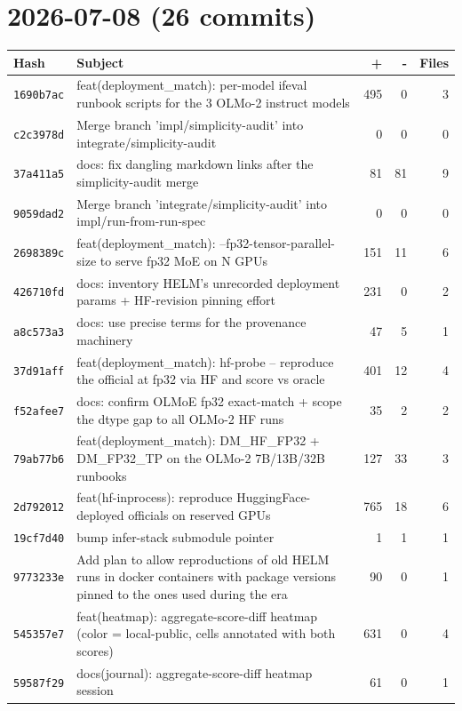 \section*{2026-07-08 (26 commits)}
\begin{longtable}{@{}p{}p{}r r r@{}}
\toprule Hash & Subject & + & - & Files \\ \midrule\endhead
\texttt{1690b7ac} & feat(deployment\_match): per-model ifeval runbook scripts for the 3 OLMo-2 instruct models & 495 & 0 & 3 \\
\texttt{c2c3978d} & Merge branch 'impl/simplicity-audit' into integrate/simplicity-audit & 0 & 0 & 0 \\
\texttt{37a411a5} & docs: fix dangling markdown links after the simplicity-audit merge & 81 & 81 & 9 \\
\texttt{9059dad2} & Merge branch 'integrate/simplicity-audit' into impl/run-from-run-spec & 0 & 0 & 0 \\
\texttt{2698389c} & feat(deployment\_match): --fp32-tensor-parallel-size to serve fp32 MoE on N GPUs & 151 & 11 & 6 \\
\texttt{426710fd} & docs: inventory HELM's unrecorded deployment params + HF-revision pinning effort & 231 & 0 & 2 \\
\texttt{a8c573a3} & docs: use precise terms for the provenance machinery & 47 & 5 & 1 \\
\texttt{37d91aff} & feat(deployment\_match): hf-probe -- reproduce the official at fp32 via HF and score vs oracle & 401 & 12 & 4 \\
\texttt{f52afee7} & docs: confirm OLMoE fp32 exact-match + scope the dtype gap to all OLMo-2 HF runs & 35 & 2 & 2 \\
\texttt{79ab77b6} & feat(deployment\_match): DM\_HF\_FP32 + DM\_FP32\_TP on the OLMo-2 7B/13B/32B runbooks & 127 & 33 & 3 \\
\texttt{2d792012} & feat(hf-inprocess): reproduce HuggingFace-deployed officials on reserved GPUs & 765 & 18 & 6 \\
\texttt{19cf7d40} & bump infer-stack submodule pointer & 1 & 1 & 1 \\
\texttt{9773233e} & Add plan to allow reproductions of old HELM runs in docker containers with package versions pinned to the ones used during the era & 90 & 0 & 1 \\
\texttt{545357e7} & feat(heatmap): aggregate-score-diff heatmap (color = local-public, cells annotated with both scores) & 631 & 0 & 4 \\
\texttt{59587f29} & docs(journal): aggregate-score-diff heatmap session & 61 & 0 & 1 \\

\end{longtable}
